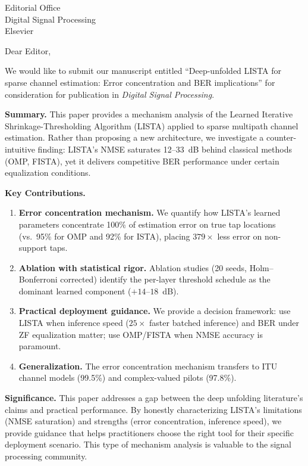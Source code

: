 \documentclass[11pt,a4paper]{letter}
\begin{document}
\begin{letter}{Editorial Office\\Digital Signal Processing\\Elsevier}

\opening{Dear Editor,}

We would like to submit our manuscript entitled ``Deep-unfolded LISTA for sparse channel estimation: Error concentration and BER implications'' for consideration for publication in \textit{Digital Signal Processing}.

\textbf{Summary.} This paper provides a mechanism analysis of the Learned Iterative Shrinkage-Thresholding Algorithm (LISTA) applied to sparse multipath channel estimation. Rather than proposing a new architecture, we investigate a counter-intuitive finding: LISTA's NMSE saturates 12--33~dB behind classical methods (OMP, FISTA), yet it delivers competitive BER performance under certain equalization conditions.

\textbf{Key Contributions.}
\begin{enumerate}
    \item \textbf{Error concentration mechanism.} We quantify how LISTA's learned parameters concentrate 100\% of estimation error on true tap locations (vs.\ 95\% for OMP and 92\% for ISTA), placing $379\times$ less error on non-support taps.
    \item \textbf{Ablation with statistical rigor.} Ablation studies (20 seeds, Holm--Bonferroni corrected) identify the per-layer threshold schedule as the dominant learned component ($+14$--$18$~dB).
    \item \textbf{Practical deployment guidance.} We provide a decision framework: use LISTA when inference speed ($25\times$ faster batched inference) and BER under ZF equalization matter; use OMP/FISTA when NMSE accuracy is paramount.
    \item \textbf{Generalization.} The error concentration mechanism transfers to ITU channel models (99.5\%) and complex-valued pilots (97.8\%).
\end{enumerate}

\textbf{Significance.} This paper addresses a gap between the deep unfolding literature's claims and practical performance. By honestly characterizing LISTA's limitations (NMSE saturation) and strengths (error concentration, inference speed), we provide guidance that helps practitioners choose the right tool for their specific deployment scenario. This type of mechanism analysis is valuable to the signal processing community.


\end{letter}
\end{document}
